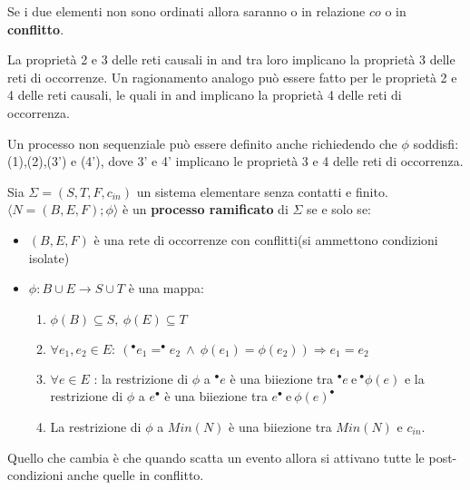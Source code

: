 Se i due elementi non sono ordinati allora saranno o in relazione $co$ o in \textbf{conflitto}.

\begin{nota}
    La proprietà 2 e 3 delle reti causali in and tra loro implicano la proprietà 3
    delle reti di occorrenze. Un ragionamento analogo può essere fatto per le proprietà
    2 e 4 delle reti causali, le quali in and implicano la proprietà 4 delle reti
    di occorrenza.
\end{nota}

\begin{nota}
    Un processo non sequenziale può essere definito anche richiedendo che $\phi$
    soddisfi: (1),(2),(3') e (4'), dove 3' e 4' implicano le proprietà 3 e 4
    delle reti di occorrenza.
\end{nota}
\begin{definizione}
    Sia $\Sigma = (S,T, F, c_{in})$ un sistema elementare senza contatti e finito.
    $\langle N = (B, E, F); \phi \rangle$ è un \textbf{processo ramificato} di $\Sigma$
    se e solo se:
    \begin{itemize}
        \item $(B, E, F)$ è una rete di occorrenze con conflitti(si ammettono condizioni isolate)
        \item $\phi: B \cup E \to S \cup T$ è una mappa:
              \begin{enumerate}
                  \item $\phi(B) \subseteq S, \ \phi(E) \subseteq T$
                  \item $\forall e_1, e_2 \in E: \ ( ^{\bullet} e_1 =  ^{\bullet}
                            e_2 \ \land \ \phi(e_1) = \phi(e_2)) \Rightarrow e_1 = e_2$
                  \item $\forall e \in E$ : la restrizione di $\phi$ a $^{\bullet} e$
                        è una biiezione tra $^{\bullet} e \ \text{e} \ ^{\bullet} \phi(e)$
                        e la restrizione di $\phi$ a $e^{\bullet}$ è una biiezione tra
                        $e^{\bullet} \ \text{e} \ \phi(e)^{\bullet}$
                  \item La restrizione di $\phi$ a $Min(N)$ è una biiezione tra
                        $Min(N)$ e $c_{in}$.
              \end{enumerate}
    \end{itemize}
\end{definizione}

Quello che cambia è che quando scatta un evento allora si attivano tutte le post-condizioni
anche quelle in conflitto.

